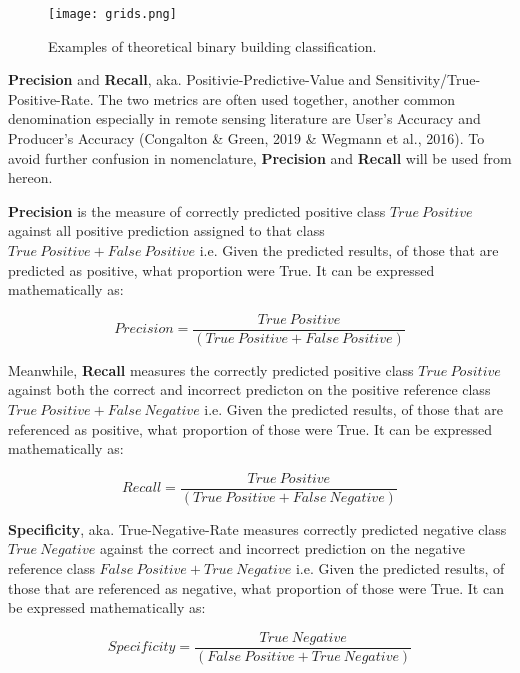 \documentclass[11pt, a4paper, twoside]{report}
\begin{document}
\begin{figure}[H]
  \centering
  \texttt{[image: grids.png]}
  \caption{Examples of theoretical binary building classification.}
  \label{fig:grids}
\end{figure}

\newpage

\textbf{Precision} and \textbf{Recall}, aka. Positivie-Predictive-Value and Sensitivity/True-Positive-Rate. The two metrics are often used together, another common denomination especially in remote sensing literature are User's Accuracy and Producer's Accuracy (Congalton \& Green, 2019 \& Wegmann et al., 2016). To avoid further confusion in nomenclature, \textbf{Precision} and \textbf{Recall} will be used from hereon.\\\par

\textbf{Precision} is the measure of correctly predicted positive class $True\ Positive$ against all positive prediction assigned to that class $True\ Positive + False\ Positive$ i.e. Given the predicted results, of those that are predicted as positive, what proportion were True. It can be expressed mathematically as:

\begin{equation}
  Precision = \frac{True\ Positive} {(True\ Positive + False\ Positive)}
\end{equation}

Meanwhile, \textbf{Recall} measures the correctly predicted positive class $True\ Positive$ against both the correct and incorrect predicton on the positive reference class $True\ Positive + False\ Negative$ i.e. Given the predicted results, of those that are referenced as positive, what proportion of those were True. It can be expressed mathematically as:

\begin{equation}
  Recall = \frac{True\ Positive} {(True\ Positive + False\ Negative)}
\end{equation}

\textbf{Specificity}, aka. True-Negative-Rate measures correctly predicted negative class $True\ Negative$ against the correct and incorrect prediction on the negative reference class $False\ Positive + True\ Negative$ i.e. Given the predicted results, of those that are referenced as negative, what proportion of those were True. It can be expressed mathematically as:

\begin{equation}
  Specificity = \frac{True\ Negative} {(False\ Positive + True\ Negative)}
\end{equation}
\end{document}
